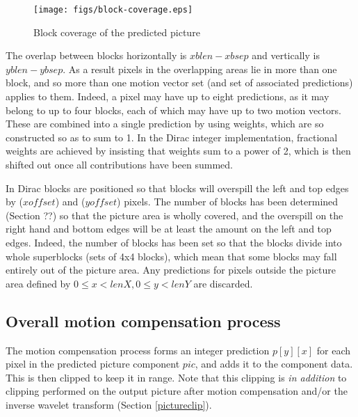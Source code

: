 \begin{figure}[!h]
\centering
\texttt{[image: figs/block-coverage.eps]}
\caption{Block coverage of the predicted picture}
\label{fig:blockcoverage}
\end{figure}

\begin{informative*}
The overlap between blocks horizontally is $xblen - xbsep$ and vertically is
$yblen - ybsep$. As a result pixels in the overlapping areas lie in more than
one block, and so more than one motion vector set (and set of associated predictions)
applies to them. Indeed, a pixel may have up to eight predictions, as it may belong to
up to four blocks, each of which may have up to two motion vectors. These are combined
into a single prediction by using weights, which are so constructed so as to sum to 1. In the
 Dirac integer implementation, fractional weights are achieved by insisting that weights sum 
to a power of 2, which is then shifted out once all contributions have been summed.

In Dirac blocks are positioned so that blocks will overspill the left and top edges by 
($xoffset$) and ($yoffset$) pixels.  The number of blocks has been
determined (Section ??) so that the picture area is wholly covered, and the overspill
 on the right hand and bottom edges will be at least the amount on the left and top edges. 
Indeed, the number of blocks has been set so that the blocks divide into whole superblocks
(sets of 4x4 blocks), which mean that some blocks may fall entirely out of the picture area. 
 Any predictions for pixels outside the picture area defined by $0 \leq x < lenX, 0 \leq y <lenY$
are discarded.

\end{informative*}

\subsection{Overall motion compensation process}
\label{mcprocess}

The motion compensation process forms an integer prediction $p[y][x]$ for each pixel in the predicted
picture component $pic$, and adds it to the component data. This is then clipped to keep it in range.
Note that this clipping is {\em in addition} to clipping performed on the output picture after motion
 compensation and/or the inverse wavelet transform (Section \ref{pictureclip}).

\begin{pseudo*}
    \bsEND
\bsEND
\end{pseudo*}

